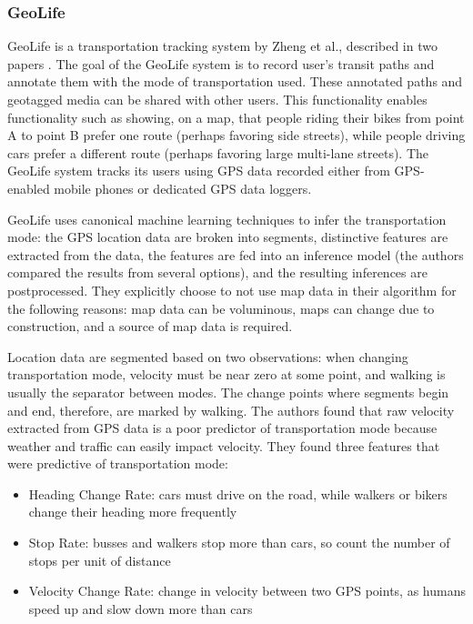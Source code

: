 \subsubsection{GeoLife}

GeoLife is a transportation tracking system by Zheng et al., described in two papers \cite{zheng-learning-mode-2008, Zheng2008Understanding-mobility}. The goal of the GeoLife system is to record user's transit paths and annotate them with the mode of transportation used. These annotated paths and geotagged media can be shared with other users. This functionality enables functionality such as showing, on a map, that people riding their bikes from point A to point B prefer one route (perhaps favoring side streets), while people driving cars prefer a different route (perhaps favoring large multi-lane streets). The GeoLife system tracks its users using GPS data recorded either from GPS-enabled mobile phones or dedicated GPS data loggers.

GeoLife uses canonical machine learning techniques to infer the transportation mode: the GPS location data are broken into segments, distinctive features are extracted from the data, the features are fed into an inference model (the authors compared the results from several options), and the resulting inferences are postprocessed. They explicitly choose to not use map data in their algorithm for the following reasons: map data can be voluminous, maps can change due to construction, and a source of map data is required.

Location data are segmented based on two observations: when changing transportation mode, velocity must be near zero at some point, and walking is usually the separator between modes. The change points where segments begin and end, therefore, are marked by walking. The authors found that raw velocity extracted from GPS data is a poor predictor of transportation mode because weather and traffic can easily impact velocity. They found three features that were predictive of transportation mode:
\begin{itemize}
	\item Heading Change Rate: cars must drive on the road, while walkers or bikers change their heading more frequently
	\item Stop Rate: busses and walkers stop more than cars, so count the number of stops per unit of distance
	\item Velocity Change Rate: change in velocity between two GPS points, as humans speed up and slow down more than cars
\end{itemize}

